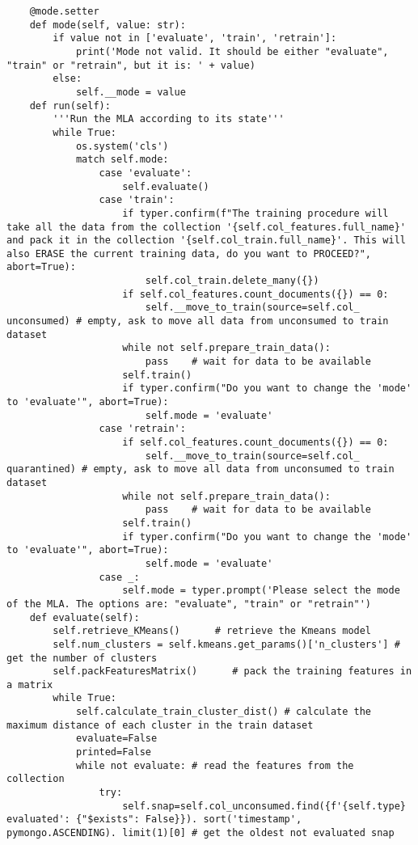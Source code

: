 \begin{verbatim}
    @mode.setter
    def mode(self, value: str):
        if value not in ['evaluate', 'train', 'retrain']:
            print('Mode not valid. It should be either "evaluate", "train" or "retrain", but it is: ' + value)
        else:
            self.__mode = value
    def run(self):
        '''Run the MLA according to its state'''
        while True:
            os.system('cls')
            match self.mode:
                case 'evaluate':
                    self.evaluate()
                case 'train':
                    if typer.confirm(f"The training procedure will take all the data from the collection '{self.col_features.full_name}' and pack it in the collection '{self.col_train.full_name}'. This will also ERASE the current training data, do you want to PROCEED?", abort=True):
                        self.col_train.delete_many({})
                    if self.col_features.count_documents({}) == 0:
                        self.__move_to_train(source=self.col_ unconsumed) # empty, ask to move all data from unconsumed to train dataset
                    while not self.prepare_train_data():
                        pass    # wait for data to be available
                    self.train()
                    if typer.confirm("Do you want to change the 'mode' to 'evaluate'", abort=True):
                        self.mode = 'evaluate'
                case 'retrain':
                    if self.col_features.count_documents({}) == 0:
                        self.__move_to_train(source=self.col_ quarantined) # empty, ask to move all data from unconsumed to train dataset
                    while not self.prepare_train_data():
                        pass    # wait for data to be available
                    self.train()
                    if typer.confirm("Do you want to change the 'mode' to 'evaluate'", abort=True):
                        self.mode = 'evaluate'
                case _:
                    self.mode = typer.prompt('Please select the mode of the MLA. The options are: "evaluate", "train" or "retrain"')
    def evaluate(self):
        self.retrieve_KMeans()      # retrieve the Kmeans model
        self.num_clusters = self.kmeans.get_params()['n_clusters'] # get the number of clusters
        self.packFeaturesMatrix()      # pack the training features in a matrix
        while True:
            self.calculate_train_cluster_dist() # calculate the maximum distance of each cluster in the train dataset
            evaluate=False
            printed=False
            while not evaluate: # read the features from the collection
                try:
                    self.snap=self.col_unconsumed.find({f'{self.type} evaluated': {"$exists": False}}). sort('timestamp', pymongo.ASCENDING). limit(1)[0] # get the oldest not evaluated snap

\end{verbatim}
